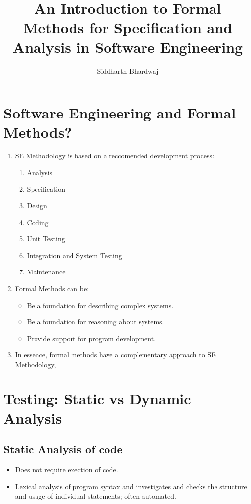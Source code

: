 \documentclass{article}
\title{An Introduction to Formal Methods for Specification and Analysis in Software Engineering}
\author{Siddharth Bhardwaj}
\begin{document}
    \maketitle
    \newpage
    \tableofcontents
    \newpage

    \section{Software Engineering and Formal Methods?}
    \begin{enumerate}
        \item SE Methodology is based on a reccomended development process:\begin{enumerate}
            \item Analysis
            \item Specification
            \item Design
            \item Coding
            \item Unit Testing 
            \item Integration and System Testing 
            \item Maintenance
        \end{enumerate}    
        \item Formal Methods can be:\begin{itemize}
            \item Be a foundation for describing complex systems.
            \item Be a foundation for reasoning about systems.
            \item Provide support for program development.
        \end{itemize}
        \item In essence, formal methods have a complementary approach to SE Methodology,
    \end{enumerate}
    \section{Testing: Static vs Dynamic Analysis}
    \subsection{Static Analysis of code}
    \begin{itemize}
        \item Does not require exection of code.
        \item Lexical analysis of program syntax and investigates and checks the structure and usage
        of individual statements; often automated. 
    \end{itemize}
\end{document}
